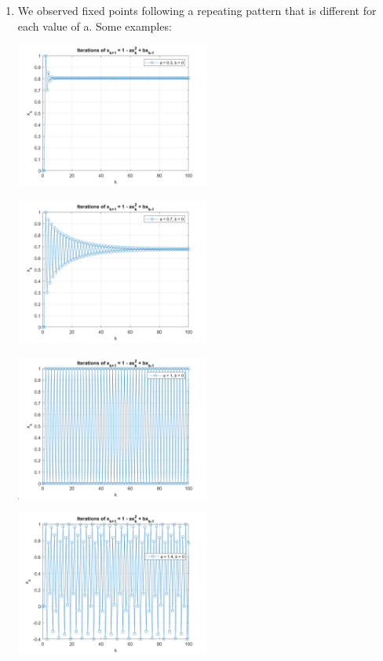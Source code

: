 \documentclass{article}
\begin{document}
\begin{enumerate} [label=\Alph*]
  \item We observed fixed points following a repeating pattern that is different for each value of a. Some examples: 
  \\ \begin{center} \includegraphics[width=0.5\textwidth]{Problem3_a0.3.png} \end{center}
  \begin{center} \includegraphics[width=0.5\textwidth]{Problem3_a0.7.png} \end{center}
  \begin{center} \includegraphics[width=0.5\textwidth]{Problem3_a1.png} \end{center}
  \begin{center} \includegraphics[width=0.5\textwidth]{Problem3_a1.4.png} \end{center}

\end{enumerate}
\end{document}
